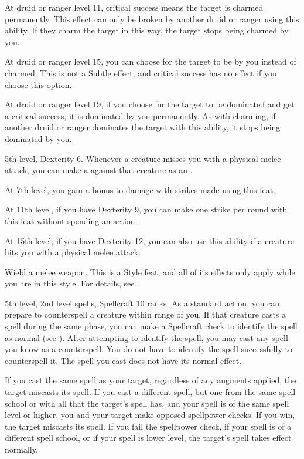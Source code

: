     At druid or ranger level 11, critical success means the target is charmed permanently.
    This effect can only be broken by another druid or ranger using this ability.
    If they charm the target in this way, the target stops being charmed by you.

    At druid or ranger level 15, you can choose for the target to be \dominated by you instead of charmed.
    This is not a Subtle effect, and critical success has no effect if you choose this option.

    At druid or ranger level 19, if you choose for the target to be dominated and get a critical success, it is dominated by you permanently.
    As with charming, if another druid or ranger dominates the target with this ability, it stops being dominated by you.

    \featpres 5th level, Dexterity 6.
    \featben Whenever a creature misses you with a physical melee attack, you can make a  against that creature as an .

    At 7th level, you gain a  bonus to damage with strikes made using this feat.

    At 11th level, if you have Dexterity 9, you can make one strike per round with this feat without spending an action.

    At 15th level, if you have Dexterity 12, you can also use this ability if a creature hits you with a physical melee attack.

    \stylereq Wield a melee weapon.
     This is a Style feat, and all of its effects only apply while you are in this style.
    For details, see .

    \featpres 5th level, 2nd level spells, Spellcraft 10 ranks.
    \featben As a standard action, you can prepare to counterspell a creature within \rngmed range of you.
    If that creature casts a spell during the same phase, you can make a Spellcraft check to identify the spell as normal (see ).
    After attempting to identify the spell, you may cast any spell you know as a counterspell.
    You do not have to identify the spell successfully to counterspell it.
    The spell you cast does not have its normal effect.

    If you cast the same spell as your target, regardless of any augments applied, the target miscasts its spell.
    If you cast a different spell, but one from the same spell school or with all  that the target's spell has, and your spell is of the same spell level or higher, you and your target make opposed spellpower checks.
    If you win, the target miscasts its spell.
    If you fail the spellpower check, if your spell is of a different spell school, or if your spell is lower level, the target's spell takes effect normally.

